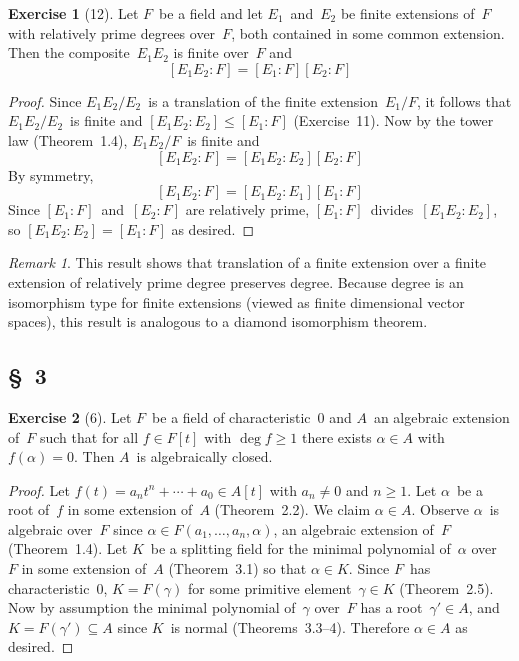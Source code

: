 \documentclass[letterpaper,12pt]{article}
\theoremstyle{definition}
\newtheorem*{exer}{Exercise}
\theoremstyle{remark}
\newtheorem*{rmk}{Remark}
\theoremstyle{direction}
\begin{document}
\begin{exer}[12]
Let \(F\)~be a field and let \(E_1\)~and~\(E_2\) be finite extensions of~\(F\) with relatively prime degrees over~\(F\), both contained in some common extension. Then the composite~\(E_1E_2\) is finite over~\(F\) and
\[[E_1E_2:F]=[E_1:F][E_2:F]\]
\end{exer}
\begin{proof}
Since \(E_1E_2/E_2\)~is a translation of the finite extension~\(E_1/F\), it follows that \(E_1E_2/E_2\)~is finite and \([E_1E_2:E_2]\le[E_1:F]\) (Exercise~11). Now by the tower law (Theorem~1.4), \(E_1E_2/F\)~is finite and
\[[E_1E_2:F]=[E_1E_2:E_2][E_2:F]\]
By symmetry,
\[[E_1E_2:F]=[E_1E_2:E_1][E_1:F]\]
Since \([E_1:F]\)~and~\([E_2:F]\) are relatively prime, \([E_1:F]\)~divides~\([E_1E_2:E_2]\), so \([E_1E_2:E_2]=[E_1:F]\) as desired.
\end{proof}
\begin{rmk}
This result shows that translation of a finite extension over a finite extension of relatively prime degree preserves degree. Because degree is an isomorphism type for finite extensions (viewed as finite dimensional vector spaces), this result is analogous to a diamond isomorphism theorem.
\end{rmk}

\subsection*{\S~3}
\begin{exer}[6]
Let \(F\)~be a field of characteristic~\(0\) and \(A\)~an algebraic extension of~\(F\) such that for all \(f\in F[t]\) with \(\deg f\ge1\) there exists \(\alpha\in A\) with \(f(\alpha)=0\). Then \(A\)~is algebraically closed.
\end{exer}
\begin{proof}
Let \(f(t)=a_nt^n+\cdots+a_0\in A[t]\) with \(a_n\ne0\) and \(n\ge1\). Let \(\alpha\)~be a root of~\(f\) in some extension of~\(A\) (Theorem~2.2). We claim \(\alpha\in A\). Observe \(\alpha\)~is algebraic over~\(F\) since \(\alpha\in F(a_1,\ldots,a_n,\alpha)\), an algebraic extension of~\(F\) (Theorem~1.4). Let \(K\)~be a splitting field for the minimal polynomial of~\(\alpha\) over~\(F\) in some extension of~\(A\) (Theorem~3.1) so that \(\alpha\in K\). Since \(F\)~has characteristic~\(0\), \(K=F(\gamma)\) for some primitive element~\(\gamma\in K\) (Theorem~2.5). Now by assumption the minimal polynomial of~\(\gamma\) over~\(F\) has a root~\(\gamma'\in A\), and \(K=F(\gamma')\subseteq A\) since \(K\)~is normal (Theorems~3.3--4). Therefore \(\alpha\in A\) as desired.
\end{proof}
\end{document}
